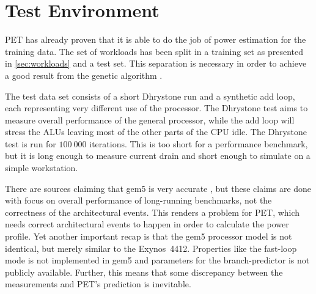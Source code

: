\section{Test Environment}

PET has already proven that it is able to do the job of power estimation for the
training data. The set of workloads has been split in a training set as
presented in \autoref{sec:workloads} and a test set. This separation is
necessary in order to achieve a good result from the genetic algorithm
\cite{russellnorvig,rajer2003separation}.

The test data set consists of a short Dhrystone run and a synthetic add loop,
each representing very different use of the processor. The Dhrystone test aims
to measure overall performance of the general processor, while the add loop will
stress the ALUs leaving most of the other parts of the CPU idle. The Dhrystone
test is run for $100~000$ iterations. This is too short for a performance
benchmark, but it is long enough to measure current drain and short enough to
simulate on a simple workstation.

There are sources claiming that gem5 is very accurate
\cite{butko2012accuracy,pusdesrissources}, but these claims are done with focus
on overall performance of long-running benchmarks, not the correctness of the
architectural events. This renders a problem for PET, which needs correct
architectural events to happen in order to calculate the power profile. Yet
another important recap is that the gem5 processor model is not identical, but
merely similar to the Exynos~4412. Properties like the fast-loop mode is not
implemented in gem5 and parameters for the branch-predictor is not publicly
available. Further, this means that some discrepancy between the measurements
and PET's prediction is inevitable.
